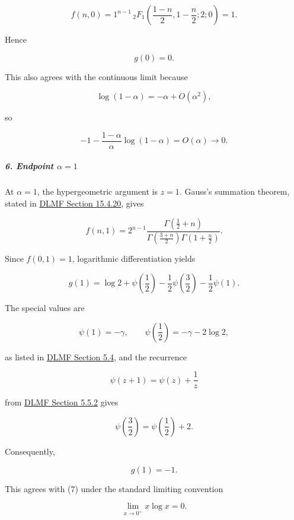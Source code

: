 \[
f(n,0) = 1^{n-1}\,{}_2F_1\left(\frac{1-n}{2},1-\frac n2;2;0\right) =1.
\]

Hence

\[
g(0)=0.
\]

This also agrees with the continuous limit because

\[
\log(1-\alpha)=-\alpha+O(\alpha^2),
\]

so

\[
-1-\frac{1-\alpha}{\alpha}\log(1-\alpha) =O(\alpha)\longrightarrow0.
\]

\subparagraph*{6. Endpoint $\alpha=1$}

At $\alpha=1$, the hypergeometric argument is $z=1$. Gauss's summation theorem, stated in \href{\detokenize{https://dlmf.nist.gov/15.4.E20}}{DLMF Section 15.4.20}, gives

\[
f(n,1) = 2^{n-1} \frac{ \Gamma\left(\frac12+n\right) }{ \Gamma\left(\frac{3+n}{2}\right) \Gamma\left(1+\frac n2\right) }.
\]

Since $f(0,1)=1$, logarithmic differentiation yields

\[
g(1) = \log2+\psi\left(\frac12\right) -\frac12\psi\left(\frac32\right) -\frac12\psi(1).
\]

The special values are

\[
\psi(1)=-\gamma, \qquad \psi\left(\frac12\right)=-\gamma-2\log2,
\]

as listed in \href{\detokenize{https://dlmf.nist.gov/5.4.E12}}{DLMF Section 5.4}, and the recurrence

\[
\psi(z+1)=\psi(z)+\frac1z
\]

from \href{\detokenize{https://dlmf.nist.gov/5.5.E2}}{DLMF Section 5.5.2} gives

\[
\psi\left(\frac32\right) = \psi\left(\frac12\right)+2.
\]

Consequently,

\[
g(1)=-1.
\]

This agrees with (7) under the standard limiting convention

\[
\lim_{x\to0^+}x\log x=0.
\]

